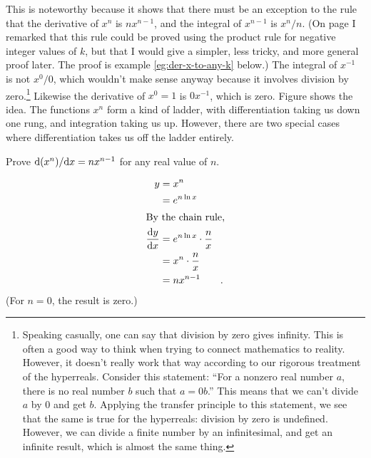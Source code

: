 This is noteworthy because it shows that there must be an exception to the rule
that the derivative of $x^n$ is $nx^{n-1}$, and the integral of $x^{n-1}$ is
$x^n/n$. (On page \pageref{coy-der-x-to-neg-k} I remarked that this rule could
be proved using the product rule for negative integer values of $k$, but that I would
give a simpler, less tricky, and more general proof later. The proof is example
\ref{eg:der-x-to-any-k} below.) The integral of $x^{-1}$ is not $x^0/0$, which wouldn't make sense anyway
because it involves division by zero.\footnote{Speaking casually, one can say  that
division by zero gives infinity. This is often a good way to think when trying to
connect mathematics to reality. However, it doesn't really work that way according
to our rigorous treatment of the hyperreals. Consider this statement:
``For a nonzero real number $a$, there is no real number $b$ such that $a=0b$.''
This means that we can't divide $a$ by 0 and get $b$. Applying the transfer principle
to this statement, we see that the same is true for the hyperreals: division by zero
is undefined. However, we can divide a finite number by an infinitesimal, and get
an infinite result, which is almost the same thing.} Likewise the derivative of
$x^0=1$ is $0x^{-1}$, which is zero. Figure  shows the idea.
The functions $x^n$ form a kind of ladder, with differentiation taking us down
one rung, and integration taking us up. However, there are two special cases where differentiation
takes us off the ladder entirely.


\begin{eg}\label{eg:der-x-to-any-k}
\egquestion Prove $\textup{d}(x^n)/\textup{d} x=nx^{n-1}$ for any real value of $n$.

\eganswer
\begin{align*}
  y &= x^n \\
    &= e^{n \ln x} \\
\intertext{By the chain rule,}
  \frac{\textup{d} y}{\textup{d} x} &= e^{n \ln x} \cdot \frac{n}{x} \\
                        &= x^n \cdot \frac{n}{x} \\
                        &= nx^{n-1} \qquad .
\end{align*}
(For $n=0$, the result is zero.)
\end{eg}

